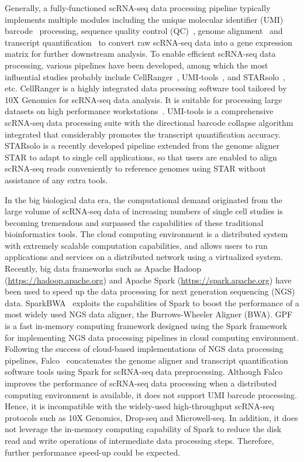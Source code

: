 \documentclass[conference]{IEEEtran}
\begin{document}
Generally, a fully-functioned scRNA-seq data processing pipeline typically implements multiple modules including the unique molecular identifier (UMI) barcode~\cite{Smith2017UMItools} processing, sequence quality control (QC)~\cite{schmieder2011quality}, genome alignment~\cite{Dobin2013STAR,Kim2015HISAT} and transcript quantification~\cite{Parekh2018zUMIs} to convert raw scRNA-seq data into a gene expression matrix for further downstream analysis. 
To enable efficient scRNA-seq data processing, various pipelines have been developed, among which the most influential studies probably include CellRanger~\cite{Zheng2017Massively}, UMI-tools~\cite{Smith2017UMItools}, and STARsolo~\cite{Blibaum2019STARsolo}, etc. 
CellRanger is a highly integrated data processing software tool tailored by 10X Genomics for scRNA-seq data analysis.
It is suitable for processing large datasets on high performance workstations~\cite{Gao2020Comparison}. 
UMI-tools is a comprehensive scRNA-seq data processing suite with the directional barcode collapse algorithm integrated that considerably promotes the transcript quantification accuracy.
STARsolo is a recently developed pipeline extended from the genome aligner STAR to adapt to single cell applications, so that users are enabled to align scRNA-seq reads conveniently to reference genomes using STAR without assistance of any extra tools.

In the big biological data era, 
the computational demand originated from the large volume of scRNA-seq data of increasing numbers of single cell studies is becoming tremendous and surpassed the capabilities of these traditional bioinformatics tools. 
The cloud computing environment is a distributed system with extremely scalable computation capabilities, and allows users to run applications and services on a distributed network using a virtualized system. 
Recently, big data frameworks such as Apache Hadoop (\url{https://hadoop.apache.org}) and Apache Spark (\url{https://spark.apache.org}) have been used to speed up the data processing for next generation sequencing (NGS) data. 
SparkBWA~\cite{Abun2016SparkBWA} exploits the capabilities of Spark to boost the performance of a most widely used NGS data aligner, the Burrows-Wheeler Aligner (BWA). 
GPF~\cite{Li2018Highperformance} is a fast in-memory computing framework designed using the Spark framework for implementing NGS data processing pipelines in cloud computing environment. 
Following the success of cloud-based implementations of NGS data processing pipelines, Falco~\cite{Yang2017Falco} concatenates the genome aligner and transcript quantification software tools using Spark for scRNA-seq data preprocessing.
Although Falco improves the performance of scRNA-seq data processing when a distributed computing environment is available, it does not support UMI barcode processing. Hence, it is incompatible with the widely-used high-throughput scRNA-seq protocols such as 10X Genomics, Drop-seq and Microwell-seq. In addition, it does not leverage the in-memory computing capability of Spark to reduce the disk read and write operations of intermediate data processing steps. Therefore, further performance speed-up could be expected. 
\end{document}
